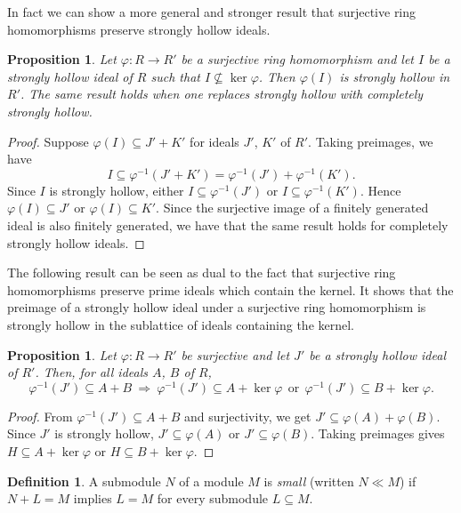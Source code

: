 \documentclass[11pt,english]{amsart}
\newtheorem{proposition}[theorem]{Proposition}
\theoremstyle{definition}
\newtheorem{definition}{Definition}[section]
\numberwithin{equation}{section}
\theoremstyle{remark}
\begin{document}
In fact we can show a more general and stronger result that surjective ring homomorphisms preserve strongly hollow ideals. 
\begin{proposition}
Let $\varphi:R\to R'$ be a surjective ring homomorphism and let $I$ be a strongly hollow ideal of $R$ such that $I\not\subseteq \ker\varphi$. Then $\varphi(I)$ is strongly hollow in $R'$. The same result holds when one replaces strongly hollow with completely strongly hollow.
\end{proposition}

\begin{proof}
Suppose $\varphi(I)\subseteq J'+K'$ for ideals $J'$, $K'$ of $ R'$. Taking preimages, we have
\[
  I \subseteq \varphi^{-1}(J'+K')=\varphi^{-1}(J')+\varphi^{-1}(K').
\]
Since $I$ is strongly hollow, either $I\subseteq \varphi^{-1}(J')$ or $I\subseteq \varphi^{-1}(K')$. Hence $\varphi(I)\subseteq J'$ or $\varphi(I)\subseteq K'$. Since the surjective image of a finitely generated ideal is also finitely generated, we have that the same result holds for completely strongly hollow ideals.  
\end{proof}

The following result can be seen as dual to the fact that surjective ring homomorphisms preserve prime ideals which contain the kernel. It shows that the preimage of a strongly hollow ideal under a surjective ring homomorphism is strongly hollow in the sublattice of ideals containing the kernel.

\begin{proposition}\label{ker-preimage}
Let $\varphi:R\to R'$ be surjective and let $J'$ be a strongly hollow ideal of $ R'$. Then, for all ideals $A$, $B$ of $R$,
\[
  \varphi^{-1}(J')\subseteq A+B \ \Rightarrow\ \varphi^{-1}(J')\subseteq A+\ker\varphi \ \ \text{or}\ \ \varphi^{-1}(J')\subseteq B+\ker\varphi.
\]
\end{proposition}

\begin{proof}
From $\varphi^{-1}(J')\subseteq A+B$ and surjectivity, we get
$J'\subseteq \varphi(A)+\varphi(B)$. Since $J'$ is strongly hollow, $J'\subseteq \varphi(A)$ or $J'\subseteq \varphi(B)$. Taking preimages gives $H\subseteq A+\ker\varphi$ or $H\subseteq B+\ker\varphi$.
\end{proof}


\begin{definition}
A submodule $N$ of a module $M$ is \emph{small} (written $N\ll M$) if $N+L=M$ implies $L=M$ for every submodule $L\subseteq M$.
\end{definition}
\end{document}
